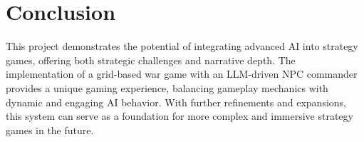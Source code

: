 \chapter{Conclusion}
This project demonstrates the potential of integrating advanced AI into strategy games, offering both strategic challenges and narrative depth. The implementation of a grid-based war game with an LLM-driven NPC commander provides a unique gaming experience, balancing gameplay mechanics with dynamic and engaging AI behavior. With further refinements and expansions, this system can serve as a foundation for more complex and immersive strategy games in the future.
